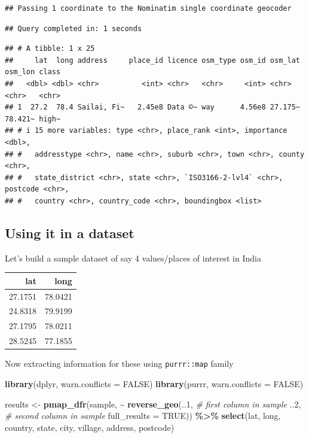 \documentclass[
]{book}
\newenvironment{Shaded}{\begin{snugshade}}{\end{snugshade}}
\newcommand{\AttributeTok}[1]{\textcolor[rgb]{0.13,0.29,0.53}{#1}}
\newcommand{\CommentTok}[1]{\textcolor[rgb]{0.56,0.35,0.01}{\textit{#1}}}
\newcommand{\ConstantTok}[1]{\textcolor[rgb]{0.56,0.35,0.01}{#1}}
\newcommand{\DecValTok}[1]{\textcolor[rgb]{0.00,0.00,0.81}{#1}}
\newcommand{\FunctionTok}[1]{\textcolor[rgb]{0.13,0.29,0.53}{\textbf{#1}}}
\newcommand{\NormalTok}[1]{#1}
\newcommand{\OtherTok}[1]{\textcolor[rgb]{0.56,0.35,0.01}{#1}}
\newcommand{\SpecialCharTok}[1]{\textcolor[rgb]{0.81,0.36,0.00}{\textbf{#1}}}
\begin{document}
\begin{verbatim}
## Passing 1 coordinate to the Nominatim single coordinate geocoder
\end{verbatim}

\begin{verbatim}
## Query completed in: 1 seconds
\end{verbatim}

\begin{verbatim}
## # A tibble: 1 x 25
##     lat  long address     place_id licence osm_type osm_id osm_lat osm_lon class
##   <dbl> <dbl> <chr>          <int> <chr>   <chr>     <int> <chr>   <chr>   <chr>
## 1  27.2  78.4 Sailai, Fi~   2.45e8 Data ©~ way      4.56e8 27.175~ 78.421~ high~
## # i 15 more variables: type <chr>, place_rank <int>, importance <dbl>,
## #   addresstype <chr>, name <chr>, suburb <chr>, town <chr>, county <chr>,
## #   state_district <chr>, state <chr>, `ISO3166-2-lvl4` <chr>, postcode <chr>,
## #   country <chr>, country_code <chr>, boundingbox <list>
\end{verbatim}

\hypertarget{using-it-in-a-dataset}{%
\subsection{Using it in a dataset}\label{using-it-in-a-dataset}}

Let's build a sample dataset of say 4 values/places of interest in India

\begin{tabular}{r|r}
\hline
lat & long\\
\hline
27.1751 & 78.0421\\
\hline
24.8318 & 79.9199\\
\hline
27.1795 & 78.0211\\
\hline
28.5245 & 77.1855\\
\hline
\end{tabular}

Now extracting information for these using \texttt{purrr::map} family

\begin{Shaded}
\begin{Highlighting}[]
\FunctionTok{library}\NormalTok{(dplyr, }\AttributeTok{warn.conflicts =} \ConstantTok{FALSE}\NormalTok{)}
\FunctionTok{library}\NormalTok{(purrr, }\AttributeTok{warn.conflicts =} \ConstantTok{FALSE}\NormalTok{)}

\NormalTok{results }\OtherTok{\textless{}{-}} \FunctionTok{pmap\_dfr}\NormalTok{(sample,}
     \SpecialCharTok{\textasciitilde{}} \FunctionTok{reverse\_geo}\NormalTok{(..}\DecValTok{1}\NormalTok{, }\CommentTok{\# first column in sample}
\NormalTok{                   ..}\DecValTok{2}\NormalTok{, }\CommentTok{\# second column in sample}
                   \AttributeTok{full\_results =} \ConstantTok{TRUE}\NormalTok{)) }\SpecialCharTok{\%\textgreater{}\%} 
  \FunctionTok{select}\NormalTok{(lat, long, country, state, city, village, address, postcode)}
\end{Highlighting}
\end{Shaded}
\end{document}
